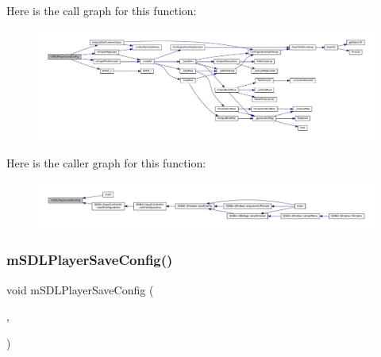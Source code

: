 Here is the call graph for this function\+:
\nopagebreak
\begin{figure}[H]
\begin{center}
\leavevmode
\includegraphics[width=350pt]{sdl-events_8h_afe63fe20f988ad01630127c84e300223_cgraph}
\end{center}
\end{figure}
Here is the caller graph for this function\+:
\nopagebreak
\begin{figure}[H]
\begin{center}
\leavevmode
\includegraphics[width=350pt]{sdl-events_8h_afe63fe20f988ad01630127c84e300223_icgraph}
\end{center}
\end{figure}
\mbox{\label{sdl-events_8h_a21daeab8663f45a3ab0104f8ae0abb18}} 
\subsubsection{\texorpdfstring{m\+S\+D\+L\+Player\+Save\+Config()}{mSDLPlayerSaveConfig()}}
{\footnotesize\ttfamily void m\+S\+D\+L\+Player\+Save\+Config (\begin{DoxyParamCaption}\item[{const struct \mbox{\hyperlink{sdl-events_8h_structm_s_d_l_player}{m\+S\+D\+L\+Player}} $\ast$}]{,  }\item[{struct Configuration $\ast$}]{ }\end{DoxyParamCaption})}

